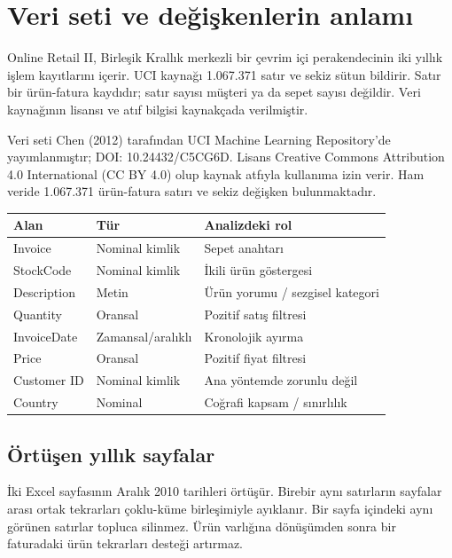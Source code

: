 \documentclass[conference,a4paper]{IEEEtran}
\begin{document}
\section{Veri seti ve değişkenlerin anlamı}
Online Retail II, Birleşik Krallık merkezli bir çevrim içi perakendecinin iki yıllık işlem kayıtlarını içerir. UCI kaynağı 1.067.371 satır ve sekiz sütun bildirir. Satır bir ürün-fatura kaydıdır; satır sayısı müşteri ya da sepet sayısı değildir. Veri kaynağının lisansı ve atıf bilgisi kaynakçada verilmiştir.

Veri seti Chen (2012) tarafından UCI Machine Learning Repository’de yayımlanmıştır; DOI: 10.24432/C5CG6D. Lisans Creative Commons Attribution 4.0 International (CC BY 4.0) olup kaynak atfıyla kullanıma izin verir. Ham veride 1.067.371 ürün-fatura satırı ve sekiz değişken bulunmaktadır.

\begin{table}[!ht]
\centering\footnotesize
\setlength{\tabcolsep}{3pt}
\renewcommand{\arraystretch}{1.15}
\begin{tabularx}{\columnwidth}{>{\raggedright\arraybackslash}X|>{\raggedright\arraybackslash}X|>{\raggedright\arraybackslash}X}
\hline
\textbf{Alan} & \textbf{Tür} & \textbf{Analizdeki rol} \\ \hline
Invoice & Nominal kimlik & Sepet anahtarı \\
StockCode & Nominal kimlik & İkili ürün göstergesi \\
Description & Metin & Ürün yorumu / sezgisel kategori \\
Quantity & Oransal & Pozitif satış filtresi \\
InvoiceDate & Zamansal/aralıklı & Kronolojik ayırma \\
Price & Oransal & Pozitif fiyat filtresi \\
Customer ID & Nominal kimlik & Ana yöntemde zorunlu değil \\
Country & Nominal & Coğrafi kapsam / sınırlılık \\
\hline
\end{tabularx}
\end{table}
\subsection{Örtüşen yıllık sayfalar}
İki Excel sayfasının Aralık 2010 tarihleri örtüşür. Birebir aynı satırların sayfalar arası ortak tekrarları çoklu-küme birleşimiyle ayıklanır. Bir sayfa içindeki aynı görünen satırlar topluca silinmez. Ürün varlığına dönüşümden sonra bir faturadaki ürün tekrarları desteği artırmaz.
\end{document}

